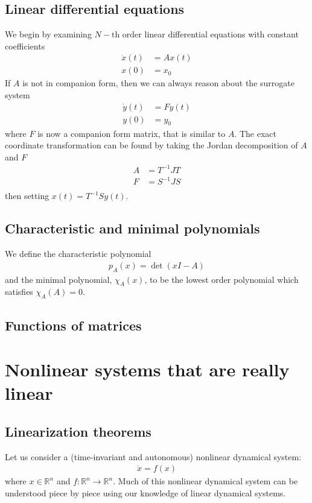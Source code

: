 \documentclass[a4paper,11pt]{exam}
\newcounter{ct}
\newcommand{\field}[1]{\ensuremath{\mathbb{#1}}}
\newcommand{\reals}{\field{R}}
\begin{document}
\begin{questions}
\subsection{Linear differential equations}
We begin by examining $N-\text{th}$ order linear differential equations with constant coefficients
\begin{align}
    \dot{x}(t) &= A x(t)\\
    x(0) &= x_0
\end{align}
If $A$ is not in companion form, then we can always reason about the surrogate system
\begin{align}
    \dot{y}(t) &= F y(t)\\
    y(0) &= y_0
\end{align}
where $F$ is now a companion form matrix, that is similar to $A$.  The exact coordinate transformation can be found by taking the Jordan decomposition of $A$ and $F$
\begin{align}
    A &= T^{-1} J T\\
    F &= S^{-1} J S\\
\end{align}
then setting $x(t) = T^{-1} S y(t)$.
\subsection{Characteristic and minimal polynomials}
We define the characteristic polynomial 
\begin{align}
    p_{A}(x) = \det \left( x I - A \right)
\end{align}
and the minimal polynomial, $\chi_A(x)$, to be the lowest order polynomial which satisfies $\chi_A(A) = 0$.

\subsection{Functions of matrices}
\section{Nonlinear systems that are really linear}
\subsection{Linearization theorems}
Let us consider a (time-invariant and autonomous) nonlinear dynamical system:
\begin{align}
    \dot{x} = f(x)
\end{align}
where $x \in \reals^n$ and $f: \reals^n \to \reals^n$.
Much of this nonlinear dynamical system can be understood piece by piece using our knowledge of linear dynamical systems.


\end{questions}
\end{document}
